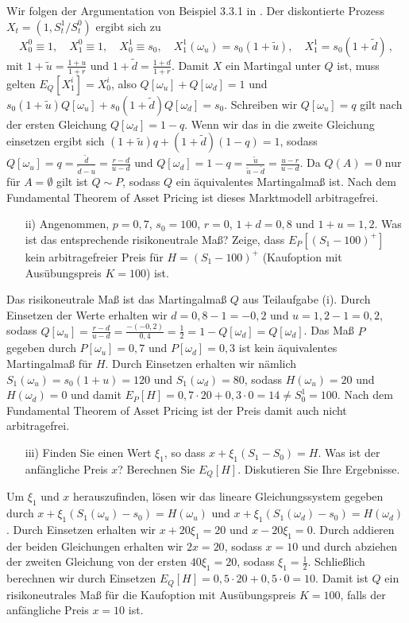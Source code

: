 \documentclass{article}
\begin{document}
Wir folgen der Argumentation von Beispiel 3.3.1 in \cite{Delbaen2006}.
Der dis\-kon\-tier\-te Prozess $X_t=(1,S^1_t/S^0_t)$ ergibt sich zu
\[
  X^0_0\equiv 1,\quad X^0_1\equiv 1,\quad X^1_0\equiv s_0,\quad X^1_1(\omega_u)=s_0(1+\tilde{u}),\quad X^1_1=s_0(1+\tilde{d})\,,
\]
mit $1+\tilde{u}=\frac{1+u}{1+r}$ und $1+\tilde{d}=\frac{1+d}{1+r}$.
Damit $X$ ein Martingal unter $Q$ ist, muss gelten $E_Q[X^i_1]=X^i_0$, also $Q[\omega_u]+Q[\omega_d]=1$ und $s_0(1+\tilde{u})Q[\omega_u]+s_0(1+\tilde{d})Q[\omega_d]=s_0$.
Schreiben wir $Q[\omega_u]=q$ gilt nach der ersten Gleichung $Q[\omega_d]=1-q$.
Wenn wir das in die zweite Gleichung einsetzen ergibt sich $(1+\tilde{u})q+(1+\tilde{d})(1-q)=1$, sodass $Q[\omega_u]=q=\frac{\tilde{d}}{\tilde{d}-u}=\frac{r-d}{u-d}$ und $Q[\omega_d]=1-q=\frac{\tilde{u}}{\tilde{u}-\tilde{d}}=\frac{u-r}{u-d}$.
Da $Q(A)=0$ nur für $A=\emptyset$ gilt ist $Q\sim P$, sodass $Q$ ein äquivalentes Martingalmaß ist.
Nach dem Fundamental Theorem of Asset Pricing ist dieses Marktmodell arbitragefrei.
\pagebreak
\begin{itemize}
\item [ii)] Angenommen, $p=0{,}7$, $s_0=100$, $r=0$, $1+d=0{,}8$ und $1+u=1{,}2$.
  Was ist das entsprechende risikoneutrale Maß?
  Zeige, dass $E_P[(S_1-100)^+]$ kein arbitragefreier Preis für $H=(S_1-100)^+$ (Kaufoption mit Ausübungspreis $K=100$) ist.
\end{itemize}
Das risikoneutrale Maß ist das Martingalmaß $Q$ aus Teilaufgabe (i).
Durch Einsetzen der Werte erhalten wir $d=0{,}8-1=-0{,}2$ und $u=1{,}2-1=0{,}2$, sodass $Q[\omega_u]=\frac{r-d}{u-d}=\frac{-(-0{,}2)}{0{,}4}=\frac{1}{2}=1-Q[\omega_d]=Q[\omega_d]$.
Das Maß $P$ gegeben durch $P[\omega_u]=0{,}7$ und $P[\omega_d]=0{,}3$ ist kein äquivalentes Martingalmaß für $H$.
Durch Einsetzen erhalten wir nämlich $S_1(\omega_u)=s_0(1+u)=120$ und $S_1(\omega_d)=80$, sodass $H(\omega_u)=20$ und $H(\omega_d)=0$ und damit $E_P[H]=0{,}7\cdot20+0{,}3\cdot0=14\neq S^1_0=100$.
Nach dem Fundamental Theorem of Asset Pricing ist der Preis damit auch nicht arbitragefrei.
\pagebreak
\begin{itemize}
\item [iii)] Finden Sie einen Wert $\xi_1$, so dass $x+\xi_1(S_1-S_0)=H$.
  Was ist der anfängliche Preis $x$?
  Berechnen Sie $E_Q[H]$.
  Diskutieren Sie Ihre Ergebnisse.
\end{itemize}
Um $\xi_1$ und $x$ herauszufinden, lösen wir das lineare Gleichungssystem gegeben durch $x+\xi_1(S_1(\omega_u)-s_0)=H(\omega_u)$ und $x+\xi_1(S_1(\omega_d)-s_0)=H(\omega_d)$.
Durch Einsetzen erhalten wir $x+20\xi_1=20$ und $x-20\xi_1=0$.
Durch addieren der beiden Gleichungen erhalten wir $2x=20$, sodass $x=10$ und durch abziehen der zweiten Gleichung von der ersten $40\xi_1=20$, sodass $\xi_1=\frac{1}{2}$.
Schließlich berechnen wir durch Einsetzen $E_Q[H]=0{,}5\cdot20+0{,}5\cdot0=10$.
Damit ist $Q$ ein risikoneutrales Maß für die Kaufoption mit Ausübungspreis $K=100$, falls der anfängliche Preis $x=10$ ist.

\end{document}
